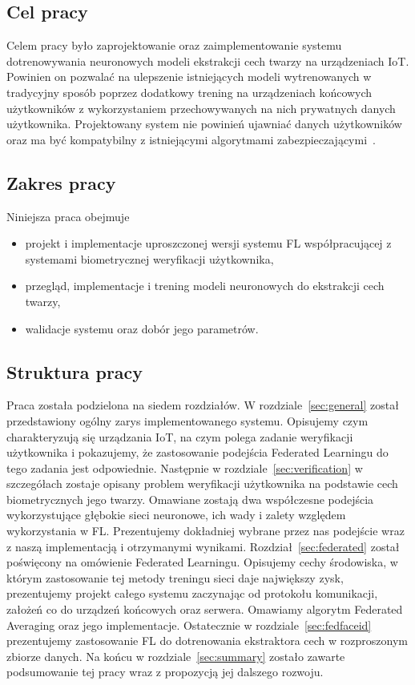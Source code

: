 \subsection{Cel pracy}
Celem pracy było zaprojektowanie oraz zaimplementowanie systemu dotrenowywania neuronowych modeli ekstrakcji cech twarzy na urządzeniach IoT. Powinien on pozwalać na ulepszenie istniejących modeli wytrenowanych w tradycyjny sposób poprzez dodatkowy trening na urządzeniach końcowych użytkowników z wykorzystaniem przechowywanych na nich prywatnych danych użytkownika. Projektowany system nie powinień ujawniać danych użytkowników oraz ma być kompatybilny z istniejącymi algorytmami zabezpieczającymi~\cite{FLSecureAggregation}.

\subsection{Zakres pracy}
Niniejsza praca obejmuje
\begin{itemize}
    \item  projekt i implementacje uproszczonej wersji systemu FL współpracującej z systemami biometrycznej weryfikacji użytkownika,
    \item przegląd, implementacje i trening modeli neuronowych do ekstrakcji cech twarzy,
    \item walidacje systemu oraz dobór jego parametrów.
\end{itemize}

\subsection{Struktura pracy}
Praca została podzielona na siedem rozdziałów. W rozdziale~\ref{sec:general} został przedstawiony ogólny zarys implementowanego systemu. Opisujemy czym charakteryzują się urządzania IoT, na czym
polega zadanie weryfikacji użytkownika i pokazujemy, że zastosowanie podejścia Federated
Learningu do tego zadania jest odpowiednie. Następnie w rozdziale~\ref{sec:verification} w
szczegółach zostaje opisany problem weryfikacji użytkownika na podstawie cech biometrycznych jego
twarzy. Omawiane zostają dwa współczesne podejścia wykorzystujące głębokie sieci neuronowe, ich
wady i zalety względem wykorzystania w FL. Prezentujemy dokładniej wybrane przez nas podejście
wraz z naszą implementacją i otrzymanymi wynikami. Rozdział~\ref{sec:federated} został poświęcony
na omówienie Federated Learningu. Opisujemy cechy środowiska, w którym zastosowanie tej metody
treningu sieci daje największy zysk, prezentujemy projekt całego systemu zaczynając od protokołu
komunikacji, założeń co do urządzeń końcowych oraz serwera. Omawiamy algorytm Federated
Averaging oraz jego implementacje. Ostatecznie w rozdziale~\ref{sec:fedfaceid} prezentujemy zastosowanie FL do dotrenowania
ekstraktora cech w rozproszonym zbiorze danych. Na końcu w rozdziale~\ref{sec:summary} zostało
zawarte podsumowanie tej pracy wraz z propozycją jej dalszego rozwoju.